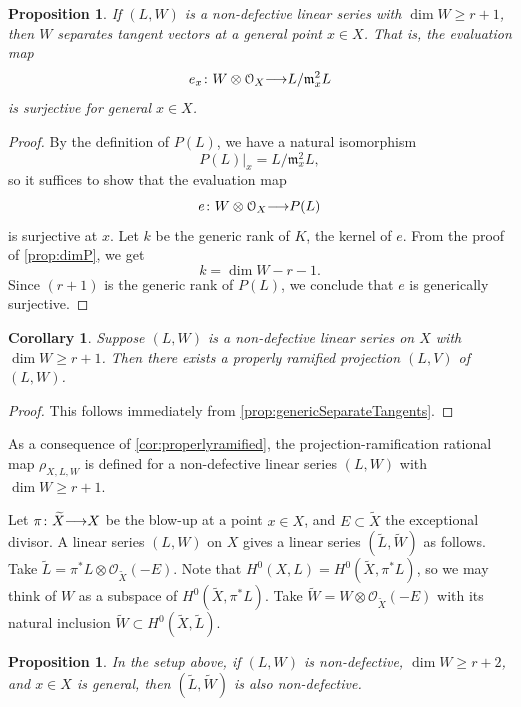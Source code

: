 \documentclass[11pt,reqno]{amsart}
\theoremstyle{plain}
\newtheorem{proposition}[theorem]{Proposition}
\newtheorem{corollary}[theorem]{Corollary}
\theoremstyle{definition}
\theoremstyle{remark}
\numberwithin{equation}{section}
\renewcommand{\to}{{\longrightarrow}}
\numberwithin{equation}{section}
\renewcommand{\O}{\mathcal O}
\begin{document}
\begin{proposition}
  \label{prop:genericSeparateTangents}
  If $(L, W)$ is a non-defective linear series with $\dim W \geq r+1$, then $W$ separates tangent vectors at a general point $x \in X$.
  That is, the evaluation map
  \[e_{x}\from W \otimes \O_X \to L/\mathfrak m_x^2 L\]
  is surjective for general $x \in X$.
\end{proposition}
\begin{proof}
  By the definition of $P(L)$, we have a natural isomorphism
  \[ P(L)|_x = L/\mathfrak m_x^2 L,\]
  so it suffices to show that the evaluation map
  \[ e \from W \otimes \O_X \to P(L)\]
  is surjective at $x$.
  Let $k$ be the generic rank of $K$, the kernel of $e$.
  From the proof of \autoref{prop:dimP}, we get
  \[  k = \dim W - r - 1.\]
  Since $(r+1)$ is the generic rank of $P(L)$, we conclude that $e$ is generically surjective.
\end{proof}
\begin{corollary}\label{cor:properlyramified}
  Suppose $(L, W)$ is a non-defective linear series on $X$ with $\dim W \geq r+1$.
  Then there exists a properly ramified projection $(L,V)$ of $(L, W)$.
\end{corollary}
\begin{proof}
  This follows immediately from \autoref{prop:genericSeparateTangents}.
\end{proof}
As a consequence of \autoref{cor:properlyramified}, the projection-ramification rational map $\rho_{X,L, W}$ is defined for a non-defective linear series $(L, W)$ with $\dim W \geq r+1$.

Let $\pi \from \widetilde X \to X$ be the blow-up at a point $x \in X$, and $E \subset \widetilde X$ the exceptional divisor.
A linear series $(L, W)$ on $X$ gives a linear series $(\widetilde L, \widetilde W)$ as follows.
Take $\widetilde L = \pi^* L \otimes \O_{\widetilde X}(-E)$.
Note that $H^0(X, L) = H^0(\widetilde X, \pi^*L)$, so we may think of $W$ as a subspace of $H^0(\widetilde X, \pi^*L)$.
Take $\widetilde W = W \otimes \O_{\widetilde X}(-E)$ with its natural inclusion $\widetilde W \subset H^0(\widetilde X, \widetilde L)$.
\begin{proposition}
  \label{prop:blowuppoint}
  In the setup above, if $(L, W)$ is non-defective, $\dim W \geq r+2$, and $x \in X$ is general, then $(\widetilde L, \widetilde W)$ is also non-defective.
\end{proposition}
\end{document}
